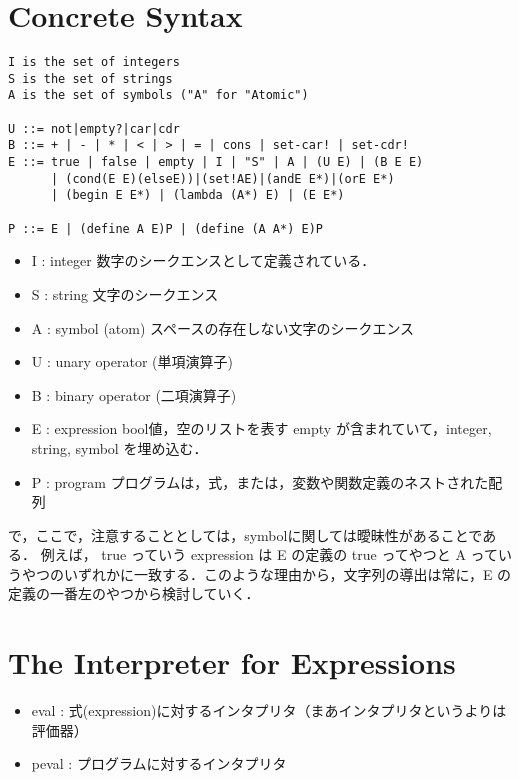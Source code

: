 \documentclass[10pt,a4paper]{jarticle}
\theoremstyle{definition}
\begin{document}
\section{Concrete Syntax}

{\small
\begin{verbatim}
I is the set of integers
S is the set of strings
A is the set of symbols ("A" for "Atomic")

U ::= not|empty?|car|cdr
B ::= + | - | * | < | > | = | cons | set-car! | set-cdr!
E ::= true | false | empty | I | "S" | A | (U E) | (B E E)
      | (cond(E E)(elseE))|(set!AE)|(andE E*)|(orE E*)
      | (begin E E*) | (lambda (A*) E) | (E E*)

P ::= E | (define A E)P | (define (A A*) E)P

\end{verbatim}}

  \begin{itemize}
  \item I : integer 数字のシークエンスとして定義されている．
  \item S : string 文字のシークエンス
  \item A : symbol (atom) スペースの存在しない文字のシークエンス
  \item U : unary operator (単項演算子)
  \item B : binary operator (二項演算子)
  \item E : expression  bool値，空のリストを表す empty が含まれていて，integer, string, symbol を埋め込む．
  \item P : program  プログラムは，式，または，変数や関数定義のネストされた配列
\end{itemize}

で，ここで，注意することとしては，symbolに関しては曖昧性があることである．
例えば， true っていう expression は E の定義の true ってやつと A っていうやつのいずれかに一致する．このような理由から，文字列の導出は常に，E の定義の一番左のやつから検討していく．

\section{The Interpreter for Expressions}
\begin{itemize}
\item eval : 式(expression)に対するインタプリタ（まあインタプリタというよりは評価器）
\item peval : プログラムに対するインタプリタ
\end{itemize}
\end{document}
